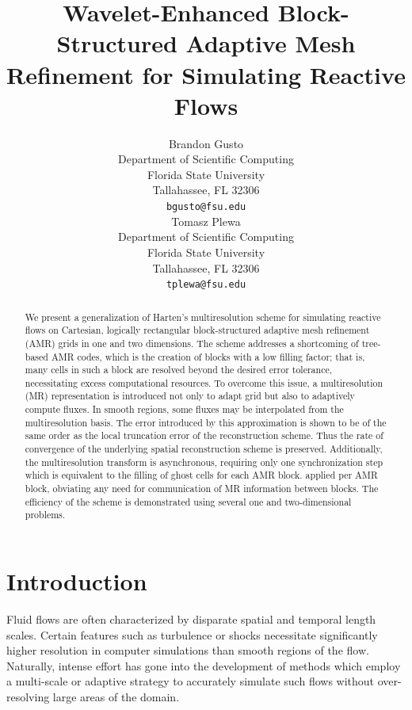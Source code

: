 \documentclass{article}
\title{Wavelet-Enhanced Block-Structured Adaptive Mesh Refinement for Simulating
Reactive Flows}
\author{
  Brandon Gusto\\
  Department of Scientific Computing\\
  Florida State University\\
  Tallahassee, FL 32306 \\
  \texttt{bgusto@fsu.edu} \\
  \And
  Tomasz Plewa \\
  Department of Scientific Computing\\
  Florida State University\\
  Tallahassee, FL 32306 \\
  \texttt{tplewa@fsu.edu} \\
}
\begin{document}
\maketitle

\begin{abstract}
    We present a generalization of Harten's multiresolution scheme for
    simulating reactive flows on Cartesian, logically rectangular
    block-structured adaptive mesh refinement (AMR) grids in one and two
    dimensions. The scheme addresses a shortcoming of tree-based AMR codes,
    which is the creation of blocks with a low filling factor; that is, many
    cells in such a block are resolved beyond the desired error tolerance,
    necessitating excess computational resources.  To overcome this issue, a
    multiresolution (MR) representation is introduced not only to adapt grid but
    also to adaptively compute fluxes. In smooth regions, some fluxes may be
    interpolated from the multiresolution basis.  The error introduced by this
    approximation is shown to be of the same order as the local truncation error
    of the reconstruction scheme. Thus the rate of convergence of the underlying
    spatial reconstruction scheme is preserved. Additionally, the
    multiresolution transform is asynchronous, requiring only one
    synchronization step which is equivalent to the filling of ghost cells for
    each AMR block. applied per AMR block, obviating any need for communication
    of MR information between blocks. The efficiency of the scheme is
    demonstrated using several one and two-dimensional problems.
\end{abstract}


\section{Introduction}

    Fluid flows are often characterized by disparate spatial and temporal length
    scales. Certain features such as turbulence or shocks necessitate
    significantly higher resolution in computer simulations than smooth regions
    of the flow.  Naturally, intense effort has gone into the development of
    methods which employ a multi-scale or adaptive strategy to accurately
    simulate such flows without over-resolving large areas of the domain.
\end{document}
